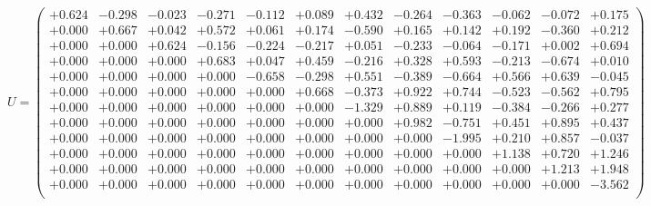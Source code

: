 \documentclass[9pt]{article}
\theoremstyle{plain}
\theoremstyle{definition}
\theoremstyle{remark}
\numberwithin{equation}{section}
\begin{document}
$U = \left(
\begin{array}{
cccccccccccc}
+0.624 & -0.298 & -0.023 & -0.271 & -0.112 & +0.089 & +0.432 & -0.264 & -0.363 & -0.062 & -0.072 & +0.175 \\
+0.000 & +0.667 & +0.042 & +0.572 & +0.061 & +0.174 & -0.590 & +0.165 & +0.142 & +0.192 & -0.360 & +0.212 \\
+0.000 & +0.000 & +0.624 & -0.156 & -0.224 & -0.217 & +0.051 & -0.233 & -0.064 & -0.171 & +0.002 & +0.694 \\
+0.000 & +0.000 & +0.000 & +0.683 & +0.047 & +0.459 & -0.216 & +0.328 & +0.593 & -0.213 & -0.674 & +0.010 \\
+0.000 & +0.000 & +0.000 & +0.000 & -0.658 & -0.298 & +0.551 & -0.389 & -0.664 & +0.566 & +0.639 & -0.045 \\
+0.000 & +0.000 & +0.000 & +0.000 & +0.000 & +0.668 & -0.373 & +0.922 & +0.744 & -0.523 & -0.562 & +0.795 \\
+0.000 & +0.000 & +0.000 & +0.000 & +0.000 & +0.000 & -1.329 & +0.889 & +0.119 & -0.384 & -0.266 & +0.277 \\
+0.000 & +0.000 & +0.000 & +0.000 & +0.000 & +0.000 & +0.000 & +0.982 & -0.751 & +0.451 & +0.895 & +0.437 \\
+0.000 & +0.000 & +0.000 & +0.000 & +0.000 & +0.000 & +0.000 & +0.000 & -1.995 & +0.210 & +0.857 & -0.037 \\
+0.000 & +0.000 & +0.000 & +0.000 & +0.000 & +0.000 & +0.000 & +0.000 & +0.000 & +1.138 & +0.720 & +1.246 \\
+0.000 & +0.000 & +0.000 & +0.000 & +0.000 & +0.000 & +0.000 & +0.000 & +0.000 & +0.000 & +1.213 & +1.948 \\
+0.000 & +0.000 & +0.000 & +0.000 & +0.000 & +0.000 & +0.000 & +0.000 & +0.000 & +0.000 & +0.000 & -3.562 \\
\end{array}
\right)$ \newline 
\end{document}
